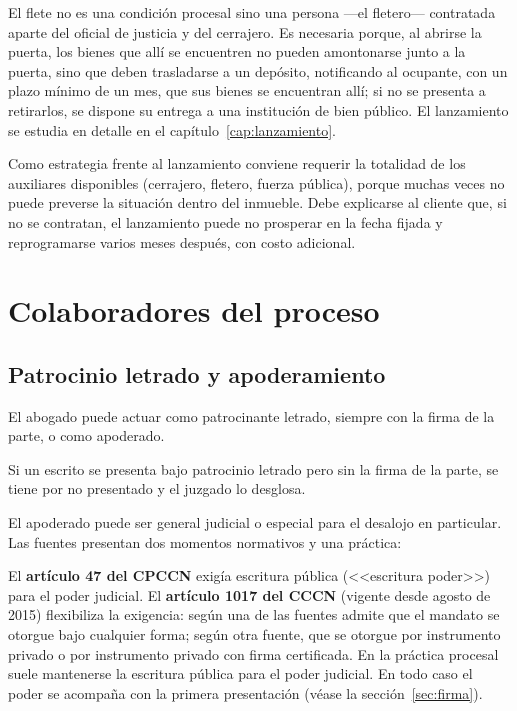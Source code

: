 \documentclass[12pt,oneside]{book}
\begin{document}
El flete no es una condición procesal sino una persona ---el fletero--- contratada aparte del oficial de justicia y del cerrajero. Es necesaria porque, al abrirse la puerta, los bienes que allí se encuentren no pueden amontonarse junto a la puerta, sino que deben trasladarse a un depósito, notificando al ocupante, con un plazo mínimo de un mes, que sus bienes se encuentran allí; si no se presenta a retirarlos, se dispone su entrega a una institución de bien público. El lanzamiento se estudia en detalle en el capítulo~\ref{cap:lanzamiento}.

\begin{note}
Como estrategia frente al lanzamiento conviene requerir la totalidad de los auxiliares disponibles (cerrajero, fletero, fuerza pública), porque muchas veces no puede preverse la situación dentro del inmueble. Debe explicarse al cliente que, si no se contratan, el lanzamiento puede no prosperar en la fecha fijada y reprogramarse varios meses después, con costo adicional.
\end{note}

\section{Colaboradores del proceso}

\subsection{Patrocinio letrado y apoderamiento}

El abogado puede actuar como patrocinante letrado, siempre con la firma de la parte, o como apoderado.

\begin{important}
Si un escrito se presenta bajo patrocinio letrado pero sin la firma de la parte, se tiene por no presentado y el juzgado lo desglosa.
\end{important}

El apoderado puede ser general judicial o especial para el desalojo en particular. Las fuentes presentan dos momentos normativos y una práctica:

\begin{important}
El \textbf{artículo 47 del CPCCN} exigía escritura pública (<<escritura poder>>) para el poder judicial. El \textbf{artículo 1017 del CCCN} (vigente desde agosto de 2015) flexibiliza la exigencia: según una de las fuentes admite que el mandato se otorgue bajo cualquier forma; según otra fuente, que se otorgue por instrumento privado o por instrumento privado con firma certificada. En la práctica procesal suele mantenerse la escritura pública para el poder judicial. En todo caso el poder se acompaña con la primera presentación (véase la sección~\ref{sec:firma}).
\end{important}
\end{document}
